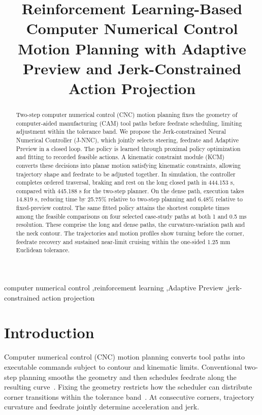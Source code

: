 \documentclass[preprint,12pt]{elsarticle}
\begin{document}
\begin{frontmatter}
\title{Reinforcement Learning-Based Computer Numerical Control Motion Planning with Adaptive Preview and Jerk-Constrained Action Projection}
\begin{abstract}
Two-step computer numerical control (CNC) motion planning fixes the geometry of computer-aided manufacturing (CAM) tool paths before feedrate scheduling, limiting adjustment within the tolerance band. We propose the Jerk-constrained Neural Numerical Controller (J-NNC), which jointly selects steering, feedrate and Adaptive Preview in a closed loop. The policy is learned through proximal policy optimization and fitting to recorded feasible actions. A kinematic constraint module (KCM) converts these decisions into planar motion satisfying kinematic constraints, allowing trajectory shape and feedrate to be adjusted together. In simulation, the controller completes ordered traversal, braking and rest on the long closed path in 444.153{} s, compared with 445.188{} s for the two-step planner. On the dense path, execution takes 14.819{} s, reducing time by 25.75\% relative to two-step planning and 6.48\% relative to fixed-preview control. The same fitted policy attains the shortest complete times among the feasible comparisons on four selected case-study paths at both 1 and 0.5 ms resolution. These comprise the long and dense paths, the curvature-variation path and the neck contour. The trajectories and motion profiles show turning before the corner, feedrate recovery and sustained near-limit cruising within the one-sided 1.25 mm Euclidean tolerance.

\end{abstract}
\begin{keyword}
computer numerical control \sep reinforcement learning \sep Adaptive Preview \sep jerk-constrained action projection
\end{keyword}
\end{frontmatter}
\raggedbottom
\section{Introduction}
\label{sec:introduction}
Computer numerical control (CNC) motion planning converts tool paths into executable commands subject to contour and kinematic limits. Conventional two-step planning smooths the geometry and then schedules feedrate along the resulting curve~\citep{Sun2022,Yan2023}. Fixing the geometry restricts how the scheduler can distribute corner transitions within the tolerance band~\citep{Erkorkmaz2001,Lee2011}. At consecutive corners, trajectory curvature and feedrate jointly determine acceleration and jerk.
\end{document}
